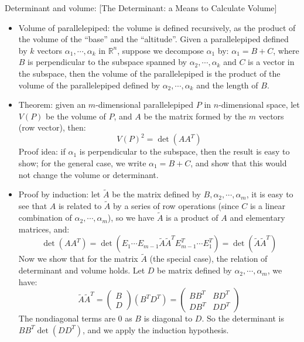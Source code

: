 \documentclass{report}
\begin{document}
Determinant and volume: [The Determinant: a Means to Calculate Volume]
\begin{itemize}
\item Volume of parallelepiped: the volume is defined recursively, as the product of the volume of the ``base'' and the ``altitude''. Given a parallelepiped defined by $k$ vectors $\alpha_1, \cdots, \alpha_k$ in $\mathbb{R}^n$, suppose we decompose $\alpha_1$ by: $\alpha_1 = B + C$, where $B$ is perpendicular to the subspace spanned by $\alpha_2, \cdots, \alpha_k$ and $C$ is a vector in the subspace, then the volume of the parallelepiped is the product of the volume of the parallelepiped defined by $\alpha_2, \cdots, \alpha_k$ and the length of $B$. 

\item Theorem: given an $m$-dimensional parallelepiped $P$ in $n$-dimensional space, let $V(P)$ be the volume of $P$, and $A$ be the matrix formed by the $m$ vectors (row vector), then: 
\begin{equation}
V(P)^2 = \det(A A^T)	
\end{equation}
Proof idea: if $\alpha_1$ is perpendicular to the subspace, then the result is easy to show; for the general case, we write $\alpha_1 = B + C$, and show that this would not change the volume or determinant.

\item Proof by induction: let $\tilde{A}$ be the matrix defined by $B, \alpha_2, \cdots, \alpha_m$, it is easy to see that $A$ is related to $\tilde{A}$ by a series of row operations (since $C$ is a linear combination of $\alpha_2, \cdots, \alpha_m$), so we have $\tilde{A}$ is a product of $A$ and elementary matrices, and: 
\begin{equation}
\det(AA^T) = \det(E_1 \cdots E_{m-1} \tilde{A} \tilde{A}^T E_{m-1}^T \cdots E_1^T) = \det(\tilde{A} \tilde{A}^T)	
\end{equation}
Now we show that for the matrix $\tilde{A}$ (the special case), the relation of determinant and volume holds. Let $D$ be matrix defined by $\alpha_2, \cdots, \alpha_m$, we have: 
\begin{equation}
\tilde{A} \tilde{A}^T = \left( \begin{array}{l} B\\ D \end{array} \right) (B^T D^T) = \left( \begin{array}{cc}
BB^T & BD^T \\
DB^T & DD^T
\end{array} \right)
\end{equation}
The nondiagonal terms are 0 as $B$ is diagonal to $D$. So the determinant is $B B^T \det(D D^T)$, and we apply the induction hypothesis. 


\end{itemize}
\end{document}
